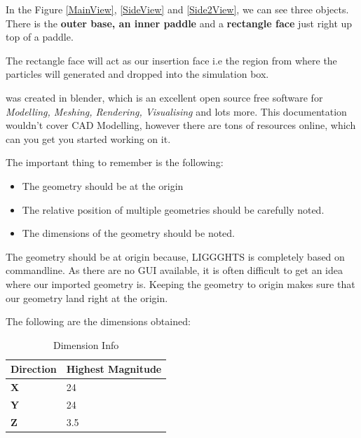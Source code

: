 \documentclass{tufte-book} %
\begin{document}
In the Figure \ref{MainView}, \ref{SideView} and \ref{Side2View}, we can see three objects.
There is the \textbf{outer base, an inner paddle} and a \textbf{rectangle face} just right up top of a paddle.

The rectangle face will act as our insertion face i.e the region from where the particles will generated and dropped into the simulation box.

 was created in blender, which is an excellent open source free software for \textit{Modelling, Meshing, Rendering, Visualising} and lots more. This documentation wouldn't cover CAD Modelling, however there are tons of resources online, which can you get you started working on it.

The important thing to remember is the following:
\begin{itemize}
\item The geometry should be at the origin
\item The relative position of multiple geometries should be carefully noted.
\item The dimensions of the geometry should be noted.
\end{itemize}

The geometry should be at origin because, LIGGGHTS is completely based on commandline. As there are no GUI available, it is often difficult to get an idea where our imported geometry is. Keeping the geometry to origin makes sure that our geometry land right at the origin.

The following are the dimensions obtained:
\begin{table}
  \centering
  \begin{tabular}{ll}
    \toprule
     Direction &  Highest Magnitude \\
    \midrule
     \textbf{X} & 24 \\
    \textbf{Y} & 24 \\
    \textbf{Z} & 3.5 \\
    \bottomrule
  \end{tabular}
  \caption{Dimension Info}
  
  \label{tab:dimensions}
\end{table}
\end{document}
